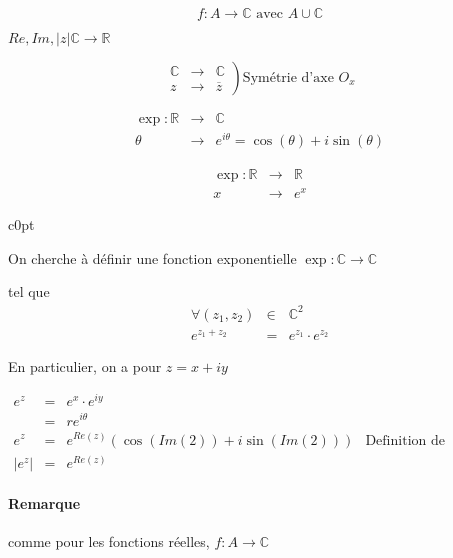 \[f : A \rightarrow \mathbb{C} \text{ avec } A \cup \mathbb{C}\]

$Re, Im, |z| \mathbb{C}  \rightarrow \mathbb{R}$

\[\left.\begin{array}{rcl}
	\mathbb{C} &\rightarrow & \mathbb{C} \\
	z &\to& \overline{z}
\end{array}\right) \text{Symétrie d'axe } O_x\]

\[
\begin{array}{rcl}
\exp : \mathbb{R} &\rightarrow& \mathbb{C} \\
\theta &\to& e^{i\theta} = \cos(\theta) + i \sin(\theta)\end{array}\]

\[
\begin{array}{rcl}
\exp : \mathbb{R} &\rightarrow& \mathbb{R} \\
x &\to& e^{x}\end{array}\]

\begin{wrapfigure}[6]{c}{0pt}
\end{wrapfigure}

On cherche à définir une fonction exponentielle $\exp : \mathbb{C} \rightarrow \mathbb{C}$

tel que \[\begin{array}{rcl}
\forall(z_1, z_2) &\in& \mathbb{C}^2 \\
e^{z_1 + z_2} &=& e^{z_1}\cdot e^{z_2}\end{array}\]

En particulier, on a pour $z = x+iy$

\[\begin{array}{rclr}
	e^z &=& e^x \cdot e^{iy} \\
		&=& re^{i\theta} \\
		e^z &=& e^{Re(z)} (\cos(Im(2)) + i \sin(Im(2))) & \text{Definition de l'exponentielle complexe} \\
		|e^z| &=& e^{Re(z)}
\end{array}\]

\paragraph{Remarque} comme pour les fonctions réelles, $f : A \rightarrow \mathbb{C}$

